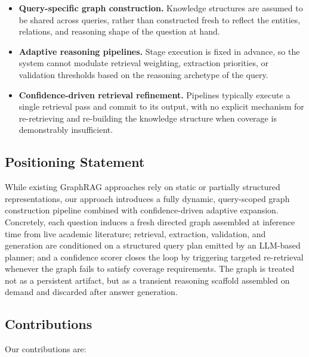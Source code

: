 \documentclass[11pt,a4paper]{article}
\begin{document}
\begin{itemize}[leftmargin=1.2em,itemsep=2pt]
  \item \textbf{Query-specific graph construction.} Knowledge structures are
  assumed to be shared across queries, rather than constructed fresh to
  reflect the entities, relations, and reasoning shape of the question at
  hand.
  \item \textbf{Adaptive reasoning pipelines.} Stage execution is fixed in
  advance, so the system cannot modulate retrieval weighting, extraction
  priorities, or validation thresholds based on the reasoning archetype of
  the query.
  \item \textbf{Confidence-driven retrieval refinement.} Pipelines typically
  execute a single retrieval pass and commit to its output, with no explicit
  mechanism for re-retrieving and re-building the knowledge structure when
  coverage is demonstrably insufficient.
\end{itemize}

\subsection{Positioning Statement}

While existing GraphRAG approaches rely on static or partially structured
representations, our approach introduces a fully dynamic, query-scoped graph
construction pipeline combined with confidence-driven adaptive expansion.
Concretely, each question induces a fresh directed graph assembled at
inference time from live academic literature; retrieval, extraction,
validation, and generation are conditioned on a structured query plan emitted
by an LLM-based planner; and a confidence scorer closes the loop by triggering
targeted re-retrieval whenever the graph fails to satisfy coverage
requirements. The graph is treated not as a persistent artifact, but as a
transient reasoning scaffold assembled on demand and discarded after answer
generation.

\subsection{Contributions}

\noindent Our contributions are:
\end{document}
